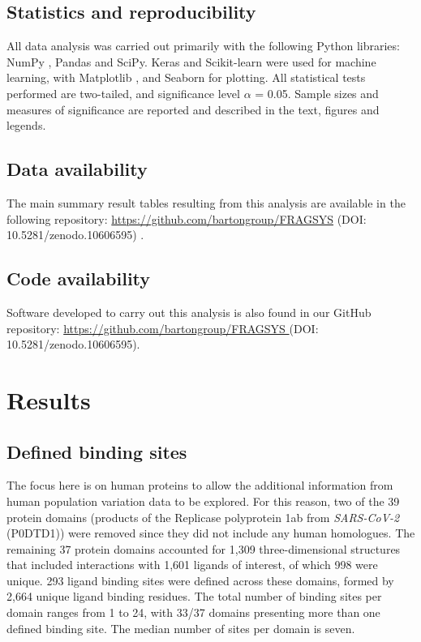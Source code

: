 \subsection{Statistics and reproducibility}

All data analysis was carried out primarily with  the following Python libraries: NumPy \cite{HARRIS_2020_NUMPY}, Pandas \cite{MCKINNEY_2010_PANDAS,PANDAS_2022_PANDAS} and SciPy. Keras and Scikit-learn were used for machine learning, with Matplotlib \cite{HUNTER_2007_MATPLOTLIB}, and Seaborn \cite{WASKOM_2021_SEABORN} for plotting. All statistical tests performed are two-tailed, and significance level $\alpha$ = 0.05. Sample sizes and measures of significance are reported and described in the text, figures and legends.

\subsection{Data availability}

The main summary result tables resulting from this analysis are available in the following repository: \url{https://github.com/bartongroup/FRAGSYS} (DOI: 10.5281/zenodo.10606595) \cite{UTGES_2024_FRAGSYS_ZENODO}.

\subsection{Code availability}

Software developed to carry out this analysis is also found in our GitHub repository: \url{https://github.com/bartongroup/FRAGSYS } (DOI: 10.5281/zenodo.10606595).

\section{Results}

\subsection{Defined binding sites}

The focus here is on human proteins to allow the additional information from human population variation data to be explored. For this reason, two of the 39 protein domains (products of the Replicase polyprotein 1ab from \textit{SARS-CoV-2} (P0DTD1)) were removed since they did not include any human homologues. The remaining 37 protein domains accounted for 1,309 three-dimensional structures that included interactions with 1,601 ligands of interest, of which 998 were unique. 293 ligand binding sites were defined across these domains, formed by 2,664 unique ligand binding residues. The total number of binding sites per domain ranges from 1 to 24, with 33/37 domains presenting more than one defined binding site. The median number of sites per domain is seven.

